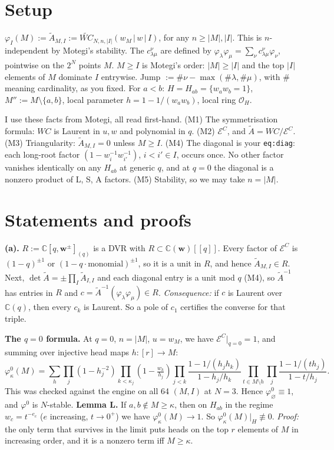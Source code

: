 \documentclass[10pt]{article}
\newcommand{\Atil}{\tilde A}
\theoremstyle{plain}
\begin{document}
\section{Setup}
$\varphi_I(M):=\Atil_{M,I}:=\widetilde{WC}_{N,n,|I|}(w_M\,|\,w\,|\,I)$, for any $n\ge |M|,|I|$. This is $n$-independent by Motegi's stability. The
$c^\nu_{\lambda\mu}$ are defined by $\varphi_\lambda\varphi_\mu=\sum_\nu c^\nu_{\lambda\mu}\varphi_\nu$, pointwise on the $2^N$ points $M$. $M\ge I$ is
Motegi's order: $|M|\ge|I|$ and the top $|I|$ elements of $M$ dominate $I$ entrywise. Jump $:=\#\nu-\max(\#\lambda,\#\mu)$, with \# meaning cardinality,
as you fixed. For $a<b$: $H=H_{ab}=\{w_aw_b=1\}$, $M'':=M\setminus\{a,b\}$, local parameter $h=1-1/(w_aw_b)$, local ring $\mathcal O_H$.

I use these facts from Motegi, all read first-hand.
(M1) The symmetrisation formula: $WC$ is Laurent in $u,w$ and polynomial in $q$.
(M2) $\mathcal E^C$, and $\Atil=WC/\mathcal E^C$.
(M3) Triangularity: $\Atil_{M,I}=0$ unless $M\ge I$.
(M4) The diagonal is your \texttt{eq:diag}: each long-root factor $(1-w_i^{-1}w_{i'}^{-1})$, $i<i'\in I$, occurs once. No other factor vanishes
identically on any $H_{ab}$ at generic $q$, and at $q=0$ the diagonal is a nonzero product of L, S, A factors.
(M5) Stability, so we may take $n=|M|$.

\section{Statements and proofs}
\textbf{(a).} $R:=\mathbb C[q,\mathbf w^{\pm}]_{(q)}$ is a DVR with $R\subset\mathbb C(\mathbf w)[[q]]$. Every factor of $\mathcal E^C$ is
$(1-q)^{\pm1}$ or $(1-q\cdot\text{monomial})^{\pm1}$, so it is a unit in $R$, and hence $\Atil_{M,I}\in R$. Next, $\det\Atil=\pm\prod_I\Atil_{I,I}$ and
each diagonal entry is a unit mod $q$ (M4), so $\Atil^{-1}$ has entries in $R$ and $c=\Atil^{-1}(\varphi_\lambda\varphi_\mu)\in R$. \emph{Consequence:} if $c$
is Laurent over $\mathbb C(q)$, then every $c_k$ is Laurent. So a pole of $c_1$ certifies the converse for that triple.

\textbf{The $q=0$ formula.} At $q=0$, $n=|M|$, $u=w_M$, we have $\mathcal E^C|_{q=0}=1$, and summing over injective head maps $h:[r]\to M$:
\[\varphi^0_\kappa(M)=\sum_h\prod_j(1-h_j^{-2})\!\!\prod_{k<\kappa_j}\!(1-\tfrac{w_k}{h_j})\prod_{j<k}\frac{1-1/(h_jh_k)}{1-h_j/h_k}
\prod_{t\in M\setminus h}\prod_j\frac{1-1/(th_j)}{1-t/h_j}.\tag{2.1}\]
This was checked against the engine on all 64 $(M,I)$ at $N=3$. Hence $\varphi^0_\varnothing\equiv1$, and $\varphi^0$ is $N$-stable.
\textbf{Lemma L.} If $a,b\notin M\ge\kappa$, then on $H_{ab}$ in the regime $w_c=t^{-e_c}$ ($e$ increasing, $t\to0^+$) we have
$\varphi^0_\kappa(M)\to1$. So $\varphi^0_\kappa(M)|_H\not\equiv0$. \emph{Proof:} the only term that survives in the limit puts heads on the top $r$
elements of $M$ in increasing order, and it is a nonzero term iff $M\ge\kappa$.
\end{document}
